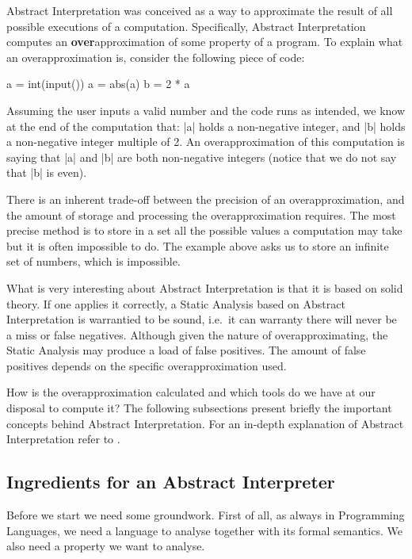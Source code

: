 Abstract Interpretation was conceived \autocite{cousot_abstract_1977} as
a way to approximate the result of all possible executions of a
computation. Specifically, Abstract Interpretation computes an
\textbf{over}approximation of some property of a program. To explain
what an overapproximation is, consider the following piece of code:

\begin{pythoncode}
a = int(input())
a = abs(a)
b = 2 * a
\end{pythoncode}

Assuming the user inputs a valid number and the code runs as intended,
we know at the end of the computation that: \pycode|a| holds a
non-negative integer, and \pycode|b| holds a non-negative integer
multiple of 2. An overapproximation of this computation is saying that
\pycode|a| and \pycode|b| are both non-negative integers (notice that we
do not say that \pycode|b| is even).

There is an inherent trade-off between the precision of an
overapproximation, and the amount of storage and processing the
overapproximation requires. The most precise method is to store in a set
all the possible values a computation may take but it is often
impossible to do. The example above asks us to store an infinite set of
numbers, which is impossible.

What is very interesting about Abstract Interpretation is that it is
based on solid theory. If one applies it correctly, a Static Analysis
based on Abstract Interpretation is warrantied to be sound, i.e.~it can
warranty there will never be a miss or false negatives. Although given
the nature of overapproximating, the Static Analysis may produce a load
of false positives. The amount of false positives depends on the
specific overapproximation used.

How is the overapproximation calculated and which tools do we have at
our disposal to compute it? The following subsections present briefly
the important concepts behind Abstract Interpretation. For an in-depth
explanation of Abstract Interpretation refer to
\textcites[Chapters 1 and 4]{nielson2015principles}%
{cousot_abstract_1977}%
{nipkow_abstract_2014}.

\subsection{Ingredients for an Abstract Interpreter}
\label{ingredients-for-an-abstract-interpreter}

Before we start we need some groundwork. First of all, as always in
Programming Languages, we need a language to analyse together with its
formal semantics. We also need a property we want to analyse.

